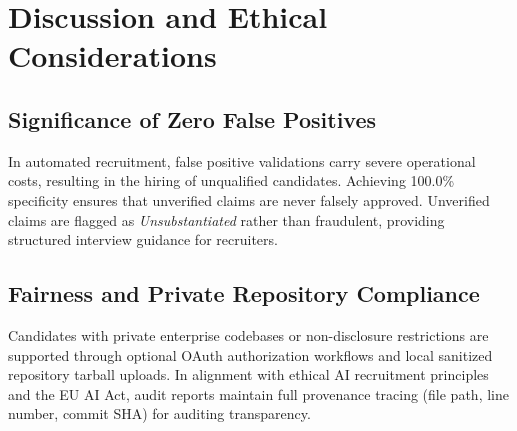 \documentclass[conference]{IEEEtran}
\begin{document}
\begin{table}[htbp]
\caption{Comparison with Prior Automated Screening Systems}
\label{tab:comparison}
\centering
{}
\end{table}

\section{Discussion and Ethical Considerations}

\subsection{Significance of Zero False Positives}
In automated recruitment, false positive validations carry severe operational costs, resulting in the hiring of unqualified candidates. Achieving 100.0\% specificity ensures that unverified claims are never falsely approved. Unverified claims are flagged as \textit{Unsubstantiated} rather than fraudulent, providing structured interview guidance for recruiters.

\subsection{Fairness and Private Repository Compliance}
Candidates with private enterprise codebases or non-disclosure restrictions are supported through optional OAuth authorization workflows and local sanitized repository tarball uploads. In alignment with ethical AI recruitment principles and the EU AI Act, audit reports maintain full provenance tracing (file path, line number, commit SHA) for auditing transparency.
\end{document}
